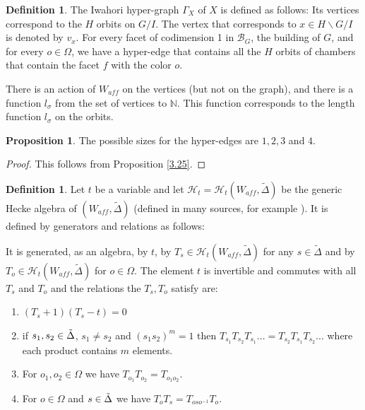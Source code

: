 \documentclass[12pt]{article}
\newcommand{\N}{\mathbb{N}}
\newcommand{\B}{\mathcal{B}}
\newcommand{\<}{\langle}
\renewcommand{\>}{\rangle}
\theoremstyle{plain}
\theoremstyle{definition}
\newtheorem{prop}[theorem]{Proposition}
\newtheorem{defn}[theorem]{Definition} %
\begin{document}
\begin{defn}
The Iwahori hyper-graph $\Gamma_X$ of $X$ is defined as follows:
Its vertices correspond to the $H$ orbits on $G/I$. The vertex that corresponds to $x\in H\backslash G/I$ is denoted by $v_x$. For every facet of codimension 1 in $\B_G$, the building of $G$, and for every $o\in \Omega$, we have a hyper-edge that contains all the $H$ orbits of chambers that contain the facet $f$ with the color $o$.

There is an action of $W_{aff}$ on the vertices (but not on the graph), and there is a function $l_\sigma$ from the set of vertices to $\N$. This function corresponds to the length function $l_\sigma$ on the orbits.
\end{defn}

\begin{prop}
The possible sizes for the hyper-edges are $1,2,3$ and $4$.
\end{prop}

\begin{proof}
This follows from Proposition \ref{3.25}.
\end{proof}

\begin{defn}
    
Let $t$ be a variable and let $\mathcal{H}_{t}=\mathcal{H}_{t}(W_{aff},\tilde{\Delta})$ be the generic Hecke algebra of $(W_{aff},\tilde{\Delta})$ (defined in many sources, for example \cite{Solleveld2021}). It is defined by generators and relations as follows:

It is generated, as an algebra, by $t$, by $T_s\in \mathcal{H}_{t}(W_{aff},\tilde{\Delta})$ for any $s\in \tilde{\Delta}$ and by $T_o\in \mathcal{H}_{t}(W_{aff},\tilde{\Delta})$ for $o\in \Omega$. The element $t$ is invertible and commutes with all $T_s$ and $T_o$ and the relations the $T_s, T_o$ satisfy are:

 \begin{enumerate}
            \item $(T_s+1)(T_s-t)=0$
            \item if $s_1,s_2\in\Tilde{\Delta}$, $s_1\neq s_2$ and $(s_1s_2)^m=1$ then $T_{s_1}T_{s_2}T_{s_1}...=T_{s_2}T_{s_1}T_{s_2}...$  where each product contains $m$ elements.
            \item For $o_1,o_2\in \Omega$ we have $T_{o_1}T_{o_2}=T_{o_1o_2}$.
            \item For $o\in \Omega$ and $s\in\Tilde{\Delta}$ we have $T_o T_s=T_{o s o^{-1}}T_o$.
         \end{enumerate}

\end{defn}
\end{document}
